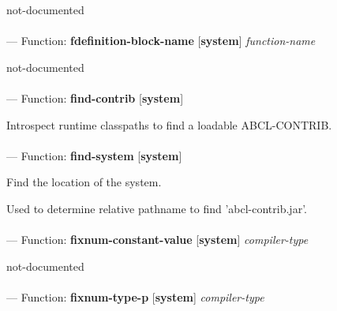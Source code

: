 \begin{adjustwidth}{5em}{5em}
not-documented
\end{adjustwidth}

\paragraph{}
\label{SYSTEM:FDEFINITION-BLOCK-NAME}
--- Function: \textbf{fdefinition-block-name} [\textbf{system}] \textit{function-name}

\begin{adjustwidth}{5em}{5em}
not-documented
\end{adjustwidth}

\paragraph{}
\label{SYSTEM:FIND-CONTRIB}
--- Function: \textbf{find-contrib} [\textbf{system}] \textit{}

\begin{adjustwidth}{5em}{5em}
Introspect runtime classpaths to find a loadable ABCL-CONTRIB.
\end{adjustwidth}

\paragraph{}
\label{SYSTEM:FIND-SYSTEM}
--- Function: \textbf{find-system} [\textbf{system}] \textit{}

\begin{adjustwidth}{5em}{5em}
Find the location of the system.

Used to determine relative pathname to find 'abcl-contrib.jar'.
\end{adjustwidth}

\paragraph{}
\label{SYSTEM:FIXNUM-CONSTANT-VALUE}
--- Function: \textbf{fixnum-constant-value} [\textbf{system}] \textit{compiler-type}

\begin{adjustwidth}{5em}{5em}
not-documented
\end{adjustwidth}

\paragraph{}
\label{SYSTEM:FIXNUM-TYPE-P}
--- Function: \textbf{fixnum-type-p} [\textbf{system}] \textit{compiler-type}

